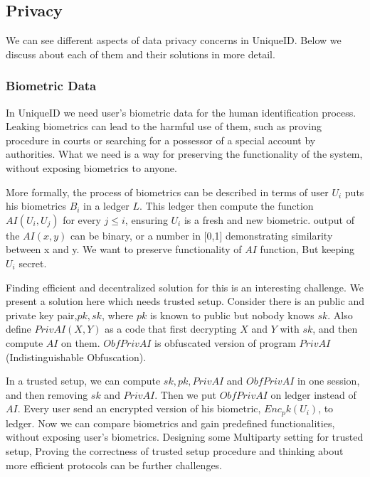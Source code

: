 \documentclass[conference]{IEEEtran}
\begin{document}
\subsection{Privacy}
We can see different aspects of data privacy concerns in UniqueID. Below we discuss about each of them and their solutions in more detail.


\subsubsection*{Biometric Data}
In UniqueID we need user's biometric data for the human identification process. Leaking biometrics can lead to the harmful use of them, such as proving procedure in courts or searching for a possessor of a special account by authorities. What we need is a way for preserving the functionality of the system, without exposing biometrics to anyone.


More formally, the process of biometrics can be described in terms of user $U_i$ puts his biometrics $B_i$ in a ledger $L$. This ledger then compute the function $AI(U_i,U_j)$ for every $j \leq i$, ensuring $U_i$ is a fresh and new biometric. output of the $AI(x,y)$ can be binary, or a number in [0,1] demonstrating similarity between x and y. We want to preserve functionality of $AI$ function, But keeping $U_i$ secret. 

Finding efficient and decentralized solution for this is an interesting challenge. We present a solution here which needs trusted setup. Consider there is an public and private key pair,$pk,sk$, where $pk$ is known to public but nobody knows $sk$. Also define $PrivAI(X,Y)$ as a code that first decrypting $X$ and $Y$ with $sk$, and then compute $AI$ on them. $ObfPrivAI$ is obfuscated version of program $PrivAI$ (Indistinguishable Obfuscation). 

In a trusted setup, we can compute $sk,pk,PrivAI$ and $ObfPrivAI$ in one session, and then removing $sk$ and $PrivAI$. Then we put $ObfPrivAI$ on ledger instead of $AI$. Every user send an encrypted version of his biometric, $Enc_pk(U_i)$, to ledger. Now we can compare biometrics and gain predefined functionalities, without exposing user's biometrics. Designing some Multiparty setting for trusted setup, Proving the correctness of trusted setup procedure and thinking about more efficient protocols can be further challenges. 
\end{document}
